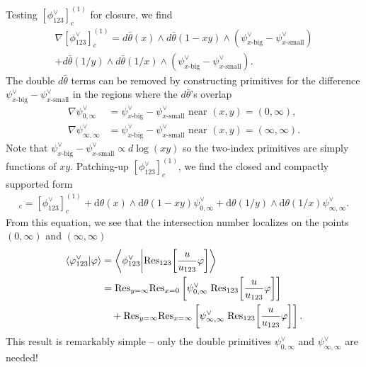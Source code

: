 \documentclass[11pt]{article}
\renewcommand{\d}{\text{d}}
\newcommand{\nn}{\nonumber}
\newcommand{\la}{\langle}
\newcommand{\ra}{\rangle}
\newcommand{\xbig}{{x\text{-big}}}
\newcommand{\xsmall}{{x\text{-small}}}
\newcommand{\res}{{\rm Res}}
\newcommand{\vphi}{\varphi}
\renewcommand{\th}{\theta}
\begin{document}
Testing $[\phi^\vee_{123}]_c^{(1)}$ for closure, we find 
\begin{align}
	\nabla[\phi^\vee_{123}]_c^{(1)} 
	= d\bar\theta(x) \wedge d\bar\theta(1-xy) 
		\wedge (\psi_\xbig^\vee - \psi_\xsmall^\vee) 
	\nn \\
	+ d\bar\theta(1/y) \wedge d\bar\theta(1/x) 
		\wedge (\psi_\xbig^\vee - \psi_\xsmall^\vee).
\end{align}
The double $d\bar\theta$ terms can be removed by constructing primitives for the difference $\psi_\xbig^\vee - \psi_\xsmall^\vee$ in the regions where the $d\bar\th$'s overlap
\begin{align}
	\nabla \psi_{0,\infty}^\vee 
	&= \psi_\xbig^\vee - \psi_\xsmall^\vee 
	\text{ near } (x,y) = (0,\infty),
	\\
	\nabla \psi_{\infty,\infty}^\vee 
	&= \psi_\xbig^\vee - \psi_\xsmall^\vee 
	\text{ near } (x,y) = (\infty,\infty).
\end{align}
Note that $\psi_\xbig^\vee - \psi_\xsmall^\vee\propto d\log (xy)$ so the two-index primitives are simply functions of $xy$.
Patching-up $[\phi^\vee_{123}]_c^{(1)}$, we find the closed and compactly supported form
\begin{align} 
	[\phi^\vee_{123}]_c 
	= [\phi^\vee_{123}]_c^{(1)} 
	+ \d\theta(x) \wedge \d\theta(1-xy) \psi_{0,\infty}^\vee
	+ \d\theta(1/y) \wedge \d\theta(1/x)\psi_{\infty,\infty}^\vee. 
\end{align}
From this equation, we see that the intersection number localizes on the points $(0,\infty)$ and $(\infty,\infty)$
\begin{align} \label{eq:tri bulk res}
	\la \vphi^\vee_{123} \vert \vphi \ra
	&= \bigg\la \phi^\vee_{123} \bigg\vert \res_{123} \bigg[\frac{u}{u_{123}}\vphi\bigg] \bigg\ra
	\nn \\
	&= \res_{y=\infty}\res_{x=0} 
	\left[ 
		\psi_{0,\infty}^\vee\; 
		\res_{123} \bigg[\frac{u}{u_{123}}\vphi\bigg] 
	\right]
	\nn \\ & \quad 
	+ \res_{y=\infty}\res_{x=\infty}
	\left[ 
		\psi_{\infty,\infty}^\vee\; 
		\res_{123} \bigg[\frac{u}{u_{123}}\vphi\bigg] 
	\right].
\end{align}
This result is remarkably simple -- only the double primitives $\psi_{0,\infty}^\vee$ and $\psi_{\infty,\infty}^\vee$ are needed! 
\end{document}

